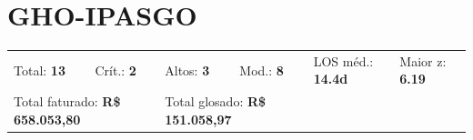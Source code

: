 \documentclass[a4paper,10pt]{article}
\begin{document}
\clearpage
\section{GHO-IPASGO}
\begin{tcolorbox}[colback=lightblue,colframe=jcubeblue,title={\textbf{Resumo --- GHO-IPASGO}}]
\begin{tabular}{ll@{\quad}ll@{\quad}ll}
Total: \textbf{13} &
Cr\'{i}t.: \textcolor{anomred}{\textbf{2}} &
Altos: \textcolor{anomorange}{\textbf{3}} &
Mod.: \textcolor{anomyellow}{\textbf{8}} &
LOS m\'{e}d.: \textbf{14.4d} &
Maior z: \textbf{6.19} \\

\multicolumn{2}{l}{Total faturado: \textbf{R\$ 658.053,80}} & 
\multicolumn{2}{l}{\textcolor{anomred}{Total glosado: \textbf{R\$ 151.058,97}}} & & \\

\end{tabular}
\end{tcolorbox}
\end{document}
